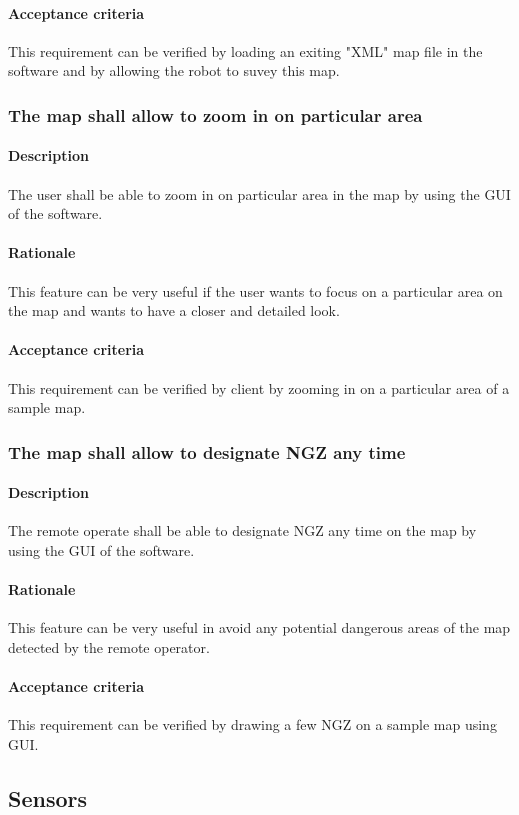 \documentclass[10pt,a4paper,titlepage]{article}
\begin{document}
    \paragraph{Acceptance criteria}   This requirement can be verified by loading an exiting "XML" map file in the software and by allowing the robot to suvey this map.
    \subsubsection{The map shall allow to zoom in on particular area }
     \paragraph{Description}   The user shall be able to zoom in on particular area in the map by using the GUI of the software.
    \paragraph{Rationale}   This feature can be very useful if the user wants to focus on a particular area on the map and wants to have a closer and detailed look.
    \paragraph{Acceptance criteria}   This requirement can be verified by client by zooming in on a particular area of a sample map.
    \subsubsection{The map shall allow to designate NGZ any time }
     \paragraph{Description}   The remote operate shall be able to designate NGZ any time on the map by using the GUI of the software.
    \paragraph{Rationale}   This feature can be very useful in avoid any potential dangerous areas of the map detected by the remote operator.
    \paragraph{Acceptance criteria}   This requirement can be verified by drawing a few NGZ on a sample map using GUI.
	\subsection{Sensors}
\end{document}
